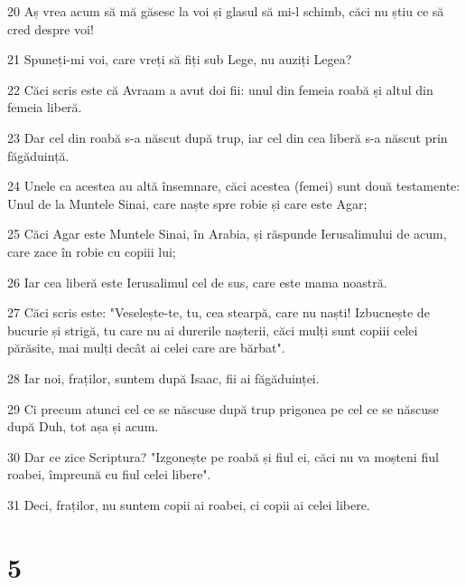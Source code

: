 \par 20 Aș vrea acum să mă găsesc la voi și glasul să mi-l schimb, căci nu știu ce să cred despre voi!
\par 21 Spuneți-mi voi, care vreți să fiți sub Lege, nu auziți Legea?
\par 22 Căci scris este că Avraam a avut doi fii: unul din femeia roabă și altul din femeia liberă.
\par 23 Dar cel din roabă s-a născut după trup, iar cel din cea liberă s-a născut prin făgăduință.
\par 24 Unele ca acestea au altă însemnare, căci acestea (femei) sunt două testamente: Unul de la Muntele Sinai, care naște spre robie și care este Agar;
\par 25 Căci Agar este Muntele Sinai, în Arabia, și răspunde Ierusalimului de acum, care zace în robie cu copiii lui;
\par 26 Iar cea liberă este Ierusalimul cel de sus, care este mama noastră.
\par 27 Căci scris este: "Veselește-te, tu, cea stearpă, care nu naști! Izbucnește de bucurie și strigă, tu care nu ai durerile nașterii, căci mulți sunt copiii celei părăsite, mai mulți decât ai celei care are bărbat".
\par 28 Iar noi, fraților, suntem după Isaac, fii ai făgăduinței.
\par 29 Ci precum atunci cel ce se născuse după trup prigonea pe cel ce se născuse după Duh, tot așa și acum.
\par 30 Dar ce zice Scriptura? "Izgonește pe roabă și fiul ei, căci nu va moșteni fiul roabei, împreună cu fiul celei libere".
\par 31 Deci, fraților, nu suntem copii ai roabei, ci copii ai celei libere.

\chapter{5}

